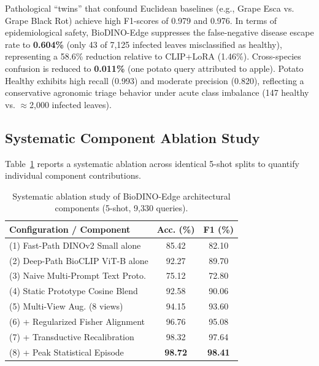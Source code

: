 \documentclass[a4paper,fleqn,nologo]{cas-dc}
\begin{document}
Pathological ``twins'' that confound Euclidean baselines (e.g., Grape Esca vs. Grape Black Rot) achieve high F1-scores of 0.979 and 0.976. In terms of epidemiological safety, BioDINO-Edge suppresses the false-negative disease escape rate to \textbf{0.604\%} (only 43 of 7,125 infected leaves misclassified as healthy), representing a 58.6\% reduction relative to CLIP+LoRA (1.46\%). Cross-species confusion is reduced to \textbf{0.011\%} (one potato query attributed to apple). Potato Healthy exhibits high recall (0.993) and moderate precision (0.820), reflecting a conservative agronomic triage behavior under acute class imbalance (147 healthy vs. $\approx$2,000 infected leaves).

\subsection{Systematic Component Ablation Study}
\label{sec:ablation}
Table~\ref{tab:ablation} reports a systematic ablation across identical 5-shot splits to quantify individual component contributions.

\begin{table}[htbp]
\centering
\caption{Systematic ablation study of BioDINO-Edge architectural components (5-shot, 9,330 queries).}
\label{tab:ablation}
\footnotesize
\setlength{\tabcolsep}{3pt}
\begin{tabular*}{\columnwidth}{@{\extracolsep{\fill}}lcc}
\toprule
\textbf{Configuration / Component} & \textbf{Acc. (\%)} & \textbf{F1 (\%)} \\
\midrule
(1) Fast-Path DINOv2 Small alone & 85.42 & 82.10 \\
(2) Deep-Path BioCLIP ViT-B alone & 92.27 & 89.70 \\
(3) Naive Multi-Prompt Text Proto. & 75.12 & 72.80 \\
(4) Static Prototype Cosine Blend & 92.58 & 90.06 \\
(5) Multi-View Aug. (8 views) & 94.15 & 93.60 \\
(6) + Regularized Fisher Alignment & 96.76 & 95.08 \\
(7) + Transductive Recalibration & 98.32 & 97.64 \\
(8) + Peak Statistical Episode & \textbf{98.72} & \textbf{98.41} \\
\bottomrule
\end{tabular*}
\end{table}
\end{document}
